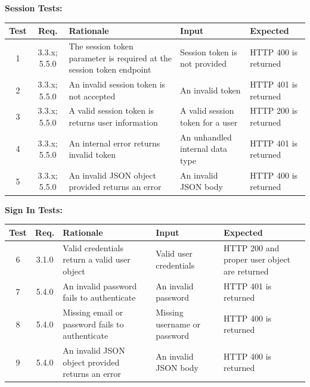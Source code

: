 \documentclass[12pt]{article}
\begin{document}
\textbf{Session Tests:}

\setlength{\tabcolsep}{3mm}
\begin{tabular}{|c|c|p{5cm}|p{3cm}|p{3cm}|}
    \hline
    Test & Req.         & Rationale                                                             & Input                            & Expected             \\

    \hline
    1    & 3.3.x; 5.5.0 & The session token parameter is required at the session token endpoint & Session token is not provided    & HTTP 400 is returned \\
    \hline
    2    & 3.3.x; 5.5.0 & An invalid session token is not accepted                              & An invalid token                 & HTTP 401 is returned \\
    \hline
    3    & 3.3.x; 5.5.0 & A valid session token is returns user information                     & A valid session token for a user & HTTP 200 is returned \\
    \hline
    4    & 3.3.x; 5.5.0 & An internal error returns invalid token                               & An unhandled internal data type  & HTTP 401 is returned \\
    \hline
    5    & 3.3.x; 5.5.0 & An invalid JSON object provided returns an error                      & An invalid JSON body             & HTTP 400 is returned \\
    \hline
\end{tabular}

\textbf{Sign In Tests:}

\setlength{\tabcolsep}{3mm}
\begin{tabular}{|c|c|p{5cm}|p{3cm}|p{3cm}|}
    \hline
    Test & Req.  & Rationale                                        & Input                        & Expected                                     \\

    \hline
    6    & 3.1.0 & Valid credentials return a valid user object     & Valid user credentials       & HTTP 200 and proper user object are returned \\
    \hline
    7    & 5.4.0 & An invalid password fails to authenticate        & An invalid password          & HTTP 401 is returned                         \\
    \hline
    8    & 5.4.0 & Missing email or password fails to authenticate  & Missing username or password & HTTP 400 is returned                         \\
    \hline
    9    & 5.4.0 & An invalid JSON object provided returns an error & An invalid JSON body         & HTTP 400 is returned                         \\
    \hline
\end{tabular}
\end{document}
